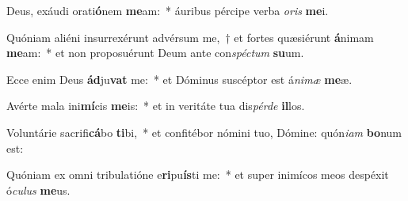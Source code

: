 \item Deus, exáudi orati\textbf{ó}nem \textbf{me}am:~* áuribus pércipe verba \textit{o}\textit{ris} \textbf{me}i.
\item Quóniam aliéni insurrexérunt advérsum me,~† et fortes quæsiérunt \textbf{á}nimam \textbf{me}am:~* et non proposuérunt Deum ante con\textit{spéc}\textit{tum} \textbf{su}um.
\item Ecce enim Deus \textbf{ád}ju\textbf{vat} me:~* et Dóminus suscéptor est á\textit{ni}\textit{mæ} \textbf{me}æ.
\item Avérte mala ini\textbf{mí}cis \textbf{me}is:~* et in veritáte tua dis\textit{pér}\textit{de} \textbf{il}los.
\item Voluntárie sacrifi\textbf{cá}bo \textbf{ti}bi,~* et confitébor nómini tuo, Dómine: quón\textit{i}\textit{am} \textbf{bo}num est:
\item Quóniam ex omni tribulatióne e\textbf{ri}pu\textbf{ís}ti me:~* et super inimícos meos despéxit ó\textit{cu}\textit{lus} \textbf{me}us.
